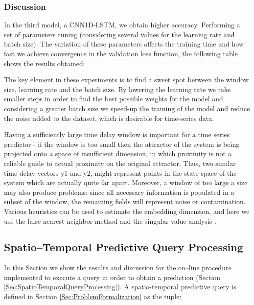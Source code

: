 \subsubsection{Discussion}
In the third model, a CNN1D-LSTM, we obtain higher accuracy. Performing a set of parameters tuning (considering several values for the learning rate and batch size). The variation of these parameters affects the training time and how fast we achieve convergence in the validation loss function, the following table shows the results obtained:

The key element in these experiments is to find a sweet spot between the window size, learning rate and the batch size. By lowering the learning rate we take smaller steps in order to find the best possible weights for the model and considering a greater batch size we speed-up the training of the model and reduce the noise added to the dataset, which is desirable for time-series data.

Having a sufficiently large time delay window is important for a time series predictor - if the window is too small then the attractor of the system is being projected onto a space of insufficient dimension, in which proximity is not a reliable guide to actual proximity on the original attractor. Thus, two similar time delay vectors y1 and y2, might represent points in the state space of the system which are actually quite far apart.  Moreover, a window of too large a size may also produce problems: since all necessary information is populated in a subset of the window, the remaining fields will represent noise or contamination.  Various heuristics can be used to estimate the embedding dimension, and here we use the false nearest neighbor method and the singular-value analysis \cite{Fawaz2019}.


\subsection{Spatio--Temporal Predictive Query Processing}

In this Section we show the results and discussion for the on--line procedure implemented to execute a query in order to obtain a prediction (Section \ref{Sec:SpatioTemporalQueryProcessing}). A spatio-temporal predictive query is defined in Section \ref{Sec:ProblemFormalization}  as the tuple:

